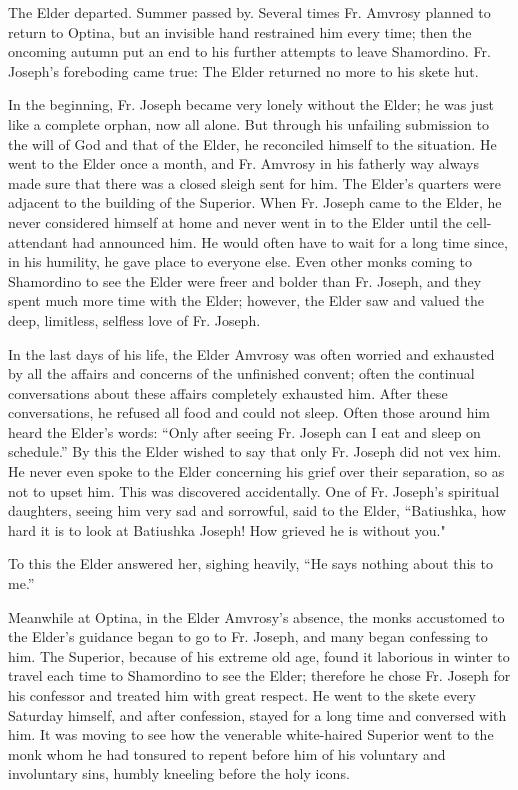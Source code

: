 The Elder departed. Summer passed by. Several times Fr. Amvrosy planned to return to Optina, but an invisible hand restrained him every time; then the oncoming autumn put an end to his further attempts to leave Shamordino. Fr. Joseph's foreboding came true: The Elder returned no more to his skete hut.

In the beginning, Fr. Joseph became very lonely without the Elder; he was just like a complete orphan, now all alone. But through his unfailing submission to the will of God and that of the Elder, he reconciled himself to the situation. He went to the Elder once a month, and Fr. Amvrosy in his fatherly way always made sure that there was a closed sleigh sent for him. The Elder's quarters were adjacent to the building of the Superior. When Fr. Joseph came to the Elder, he never considered himself at home and never went in to the Elder until the cell-attendant had announced him. He would often have to wait for a long time since, in his humility, he gave place to everyone else. Even other monks coming to Shamordino to see the Elder were freer and bolder than Fr. Joseph, and they spent much more time with the Elder; however, the Elder saw and valued the deep, limitless, selfless love of Fr. Joseph.

In the last days of his life, the Elder Amvrosy was often worried and exhausted by all the affairs and concerns of the unfinished convent; often the continual conversations about these affairs completely exhausted him. After these conversations, he refused all food and could not sleep. Often those around him heard the Elder's words: “Only after seeing Fr. Joseph can I eat and sleep on schedule.” By this the Elder wished to say that only Fr. Joseph did not vex him. He never even spoke to the Elder concerning his grief over their separation, so as not to upset him. This was discovered accidentally. One of Fr. Joseph's spiritual daughters, seeing him very sad and sorrowful, said to the Elder, “Batiushka, how hard it is to look at Batiushka Joseph! How grieved he is without you."

To this the Elder answered her, sighing heavily, “He says nothing about this to me.”

Meanwhile at Optina, in the Elder Amvrosy's absence, the monks accustomed to the Elder's guidance began to go to Fr. Joseph, and many began confessing to him. The Superior, because of his extreme old age, found it laborious in winter to travel each time to Shamordino to see the Elder; therefore he chose Fr. Joseph for his confessor and treated him with great respect. He went to the skete every Saturday himself, and after confession, stayed for a long time and conversed with him. It was moving to see how the venerable white-haired Superior went to the monk whom he had tonsured to repent before him of his voluntary and involuntary sins, humbly kneeling before the holy icons.

